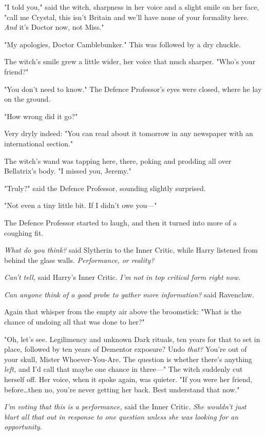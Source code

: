 "I told you," said the witch, sharpness in her voice and a slight smile on her
face, "call me Crystal, this isn’t Britain and we’ll have none of your
formality here. \emph{And} it’s Doctor now, not Miss."

"My apologies, Doctor Camblebunker." This was followed by a dry chuckle.

The witch’s smile grew a little wider, her voice that much sharper. "Who’s your
friend?"

"You don’t need to know." The Defence Professor’s eyes were closed, where he
lay on the ground.

"How wrong did it go?"

Very dryly indeed: "You can read about it tomorrow in any newspaper with an
international section."

The witch’s wand was tapping here, there, poking and prodding all over
Bellatrix’s body. "I missed you, Jeremy."

"Truly?" said the Defence Professor, sounding slightly surprised.

"Not even a tiny little bit. If I didn’t owe you—"

The Defence Professor started to laugh, and then it turned into more of a
coughing fit.

\emph{What do you think?} said Slytherin to the Inner Critic, while Harry
listened from behind the glass walls. \emph{Performance, or reality?}

\emph{Can’t tell,} said Harry’s Inner Critic. \emph{I’m not in top critical
form right now.}

\emph{Can anyone think of a good probe to gather more information?} said
Ravenclaw.

Again that whisper from the empty air above the broomstick: "What is the chance
of undoing all that was done to her?"

"Oh, let’s see. Legilimency and unknown Dark rituals, ten years for that to set
in place, followed by ten years of Dementor exposure? Undo \emph{that?} You’re
out of your skull, Mister Whoever-You-Are. The question is whether there’s
anything \emph{left,} and I’d call that maybe one chance in three—" The witch
suddenly cut herself off. Her voice, when it spoke again, was quieter. "If you
were her friend, before…then no, you’re never getting her back. Best
understand that now."

\emph{I’m voting that this is a performance,} said the Inner Critic. \emph{She
wouldn’t just blurt all that out in response to one question unless she was
looking for an opportunity.}

